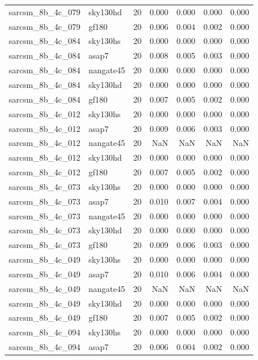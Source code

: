 \begin{tabular}{llrrrrr}
sarcsm\_8b\_4c\_079 & sky130hd & 20 & 0.000 & 0.000 & 0.000 & 0.000 \\
sarcsm\_8b\_4c\_079 & gf180 & 20 & 0.006 & 0.004 & 0.002 & 0.000 \\
sarcsm\_8b\_4c\_084 & sky130hs & 20 & 0.000 & 0.000 & 0.000 & 0.000 \\
sarcsm\_8b\_4c\_084 & asap7 & 20 & 0.008 & 0.005 & 0.003 & 0.000 \\
sarcsm\_8b\_4c\_084 & nangate45 & 20 & 0.000 & 0.000 & 0.000 & 0.000 \\
sarcsm\_8b\_4c\_084 & sky130hd & 20 & 0.000 & 0.000 & 0.000 & 0.000 \\
sarcsm\_8b\_4c\_084 & gf180 & 20 & 0.007 & 0.005 & 0.002 & 0.000 \\
sarcsm\_8b\_4c\_012 & sky130hs & 20 & 0.000 & 0.000 & 0.000 & 0.000 \\
sarcsm\_8b\_4c\_012 & asap7 & 20 & 0.009 & 0.006 & 0.003 & 0.000 \\
sarcsm\_8b\_4c\_012 & nangate45 & 20 & NaN & NaN & NaN & NaN \\
sarcsm\_8b\_4c\_012 & sky130hd & 20 & 0.000 & 0.000 & 0.000 & 0.000 \\
sarcsm\_8b\_4c\_012 & gf180 & 20 & 0.007 & 0.005 & 0.002 & 0.000 \\
sarcsm\_8b\_4c\_073 & sky130hs & 20 & 0.000 & 0.000 & 0.000 & 0.000 \\
sarcsm\_8b\_4c\_073 & asap7 & 20 & 0.010 & 0.007 & 0.004 & 0.000 \\
sarcsm\_8b\_4c\_073 & nangate45 & 20 & 0.000 & 0.000 & 0.000 & 0.000 \\
sarcsm\_8b\_4c\_073 & sky130hd & 20 & 0.000 & 0.000 & 0.000 & 0.000 \\
sarcsm\_8b\_4c\_073 & gf180 & 20 & 0.009 & 0.006 & 0.003 & 0.000 \\
sarcsm\_8b\_4c\_049 & sky130hs & 20 & 0.000 & 0.000 & 0.000 & 0.000 \\
sarcsm\_8b\_4c\_049 & asap7 & 20 & 0.010 & 0.006 & 0.004 & 0.000 \\
sarcsm\_8b\_4c\_049 & nangate45 & 20 & NaN & NaN & NaN & NaN \\
sarcsm\_8b\_4c\_049 & sky130hd & 20 & 0.000 & 0.000 & 0.000 & 0.000 \\
sarcsm\_8b\_4c\_049 & gf180 & 20 & 0.007 & 0.005 & 0.002 & 0.000 \\
sarcsm\_8b\_4c\_094 & sky130hs & 20 & 0.000 & 0.000 & 0.000 & 0.000 \\
sarcsm\_8b\_4c\_094 & asap7 & 20 & 0.006 & 0.004 & 0.002 & 0.000 \\

\end{tabular}
